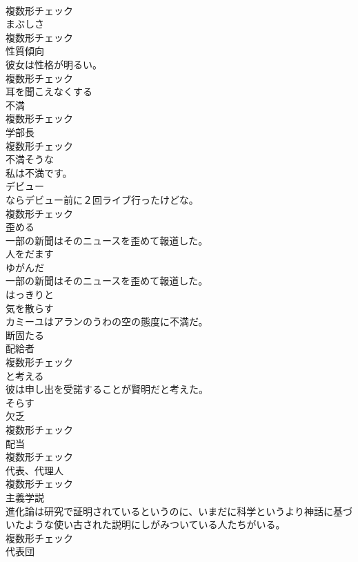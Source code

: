\documentclass[8pt]{extreport}
\begin{document}
\begin{CJK}{UTF8}{min}
\\	複数形チェック
\\	[名詞]	まぶしさ	
\\	複数形チェック
\\	[名詞]	性質傾向	
\\	彼女は性格が明るい。	
\\	複数形チェック
\\	[動詞]	耳を聞こえなくする	
\\	[名詞]	不満	
\\	複数形チェック
\\	[名詞]	学部⻑	
\\	複数形チェック
\\	[形容詞]	不満そうな	
\\	私は不満です。	
\\	[名詞]	デビュー	
\\	ならデビュー前に２回ライブ行ったけどな。	
\\	複数形チェック
\\	[動詞]	歪める	
\\	一部の新聞はそのニュースを歪めて報道した。	
\\	[形容詞]	人をだます	
\\	[形容詞]	ゆがんだ	
\\	一部の新聞はそのニュースを歪めて報道した。	
\\	[副詞]	はっきりと	
\\	[動詞]	気を散らす	
\\	カミーユはアランのうわの空の態度に不満だ。	
\\	[形容詞]	断固たる	
\\	[名詞]	配給者	
\\	複数形チェック
\\	[動詞]	と考える	
\\	彼は申し出を受諾することが賢明だと考えた。	
\\	[動詞]	そらす	
\\	[名詞]	欠乏	
\\	複数形チェック
\\	[名詞]	配当	
\\	複数形チェック
\\	[名詞]	代表、代理人	
\\	複数形チェック
\\	[名詞]	主義学説	
\\	進化論は研究で証明されているというのに、いまだに科学というより神話に基づいたような使い古された説明にしがみついている人たちがいる。	
\\	複数形チェック
\\	[名詞]	代表団	

\end{CJK}
\end{document}
